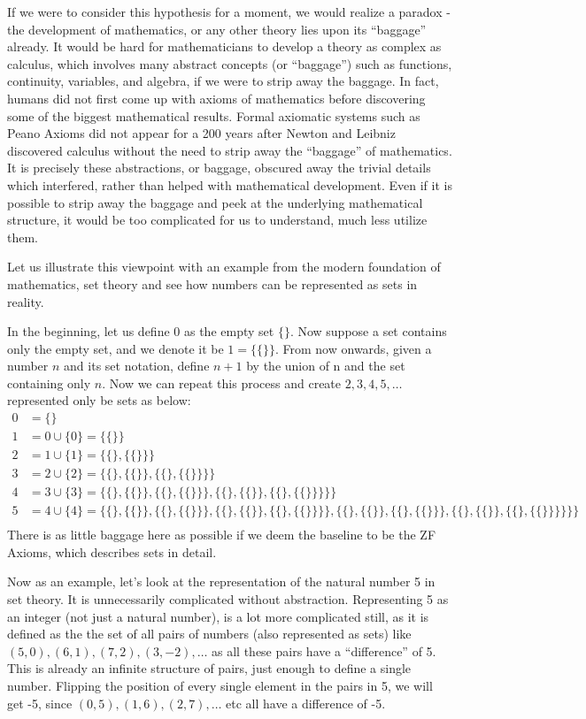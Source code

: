 \documentclass[a4paper]{article}
\newcommand{\0}{\{\}}
\newcommand{\1}{\{\0\}}
\newcommand{\2}{\{\0,\1\}}
\newcommand{\3}{\{\0,\1,\2\}}
\newcommand{\4}{\{\0,\1,\2,\3\}}
\newcommand{\5}{\{\0,\1,\2,\3,\4\}}
\begin{document}
If we were to consider this hypothesis for a moment, we would realize a paradox
- the development of mathematics, or any other theory lies upon its “baggage”
already. It would be hard for mathematicians to develop a theory as complex as
calculus, which involves many abstract concepts (or “baggage”) such as
functions, continuity, variables, and algebra, if we were to strip away the
baggage. In fact, humans did not first come up with axioms of mathematics before
discovering some of the biggest mathematical results. Formal axiomatic systems
such as Peano Axioms did not appear for a 200 years after Newton and Leibniz
discovered calculus without the need to strip away the “baggage” of
mathematics. It is precisely these abstractions, or baggage, obscured away the
trivial details which interfered, rather than helped with mathematical
development. Even if it is possible to strip away the baggage and peek at the
underlying mathematical structure, it would be too complicated for us to
understand, much less utilize them.

Let us illustrate this viewpoint with an example from the modern foundation of
mathematics, set theory and see how numbers can be represented as sets in
reality\cite{set}.

In the beginning, let us define $0$ as the empty set $\{\}$. Now suppose a set
contains only the empty set, and we denote it be $1=\{\{\}\}$. From now onwards,
given a number $n$ and its set notation, define $n+1$ by the union of n and the
set containing only $n$. Now we can repeat this process and create
$2,3,4,5,\dots$ represented only be sets as below:
\begin{align*}
0&=\0\\
1&=0\cup\{0\}=\1\\
2&=1\cup\{1\}=\2\\
3&=2\cup\{2\}=\3\\
4&=3\cup\{3\}=\4\\
5&=4\cup\{4\}=\5\\
\end{align*}
There is as little baggage here as possible if we deem the baseline to be the ZF
Axioms, which describes sets in detail.

Now as an example, let’s look at the representation of the natural number 5 in
set theory. It is unnecessarily complicated without abstraction.
Representing 5 as an integer (not just a natural number), is a lot more
complicated still, as it is defined as the the set of all pairs of numbers (also
represented as sets) like $(5, 0), (6, 1), (7, 2), (3, -2),\dots$ as all these
pairs have a “difference” of 5. This is already an infinite structure of pairs,
just enough to define a single number. Flipping the position of every single
element in the pairs in 5, we will get -5, since $(0,5), (1, 6), (2, 7),\dots$
etc all have a difference of -5.
\end{document}
